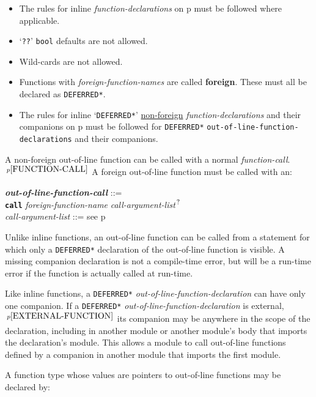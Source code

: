 \documentclass[12pt]{article}
\newcommand{\QMARK}{{$^{\,\mbox{\footnotesize ?}}$}}
\newcommand{\key}[1]{{\rm \bfseries #1}}
\newcommand{\ttkey}[1]{{\tt \bfseries #1}}
\newcommand{\emkey}[1]{{\em \bfseries #1}}
\newcommand{\pagref}[1]{p\pageref{#1}}
\newcommand{\pagnote}[1]{$\,^{p\pageref{#1}}$}
\newenvironment{indpar}[1][0.3in]%
	{\begin{list}{}%
		     {\setlength{\itemsep}{0in}%
		      \setlength{\topsep}{0in}%
		      \setlength{\parsep}{1ex}%
		      \setlength{\labelwidth}{#1}%
		      \setlength{\leftmargin}{#1}%
		      \addtolength{\leftmargin}{\labelsep}}%
	 \item}%
	{\end{list}}
\begin{document}
\begin{indpar}
\begin{itemize}
\item
The rules for inline {\em function-declarations} on
\pagref{FUNCTION-DECLARATION} must be followed where applicable.
\item
`{\tt ??}' {\tt bool} defaults are not allowed.
\item
Wild-cards are not allowed.
\item Functions with {\em foreign-function-names} are called \key{foreign}.
These must all be declared as {\tt *DEFERRED*}.
\item
The rules for inline `{\tt *DEFERRED*}' \underline{non-foreign}
{\em function-declarations} and
their companions on \pagref{COMPANION-DECLARATION}
must be followed for
{\tt *DEFERRED*} {\tt out-of-line-function-de\-clar\-ations}
and their companions.
\end{itemize}
\end{indpar}

A non-foreign out-of-line function can be called with a normal
{\em function-call}.\pagnote{FUNCTION-CALL}  A foreign
out-of-line function must be called with an:
\begin{indpar}
\emkey{out-of-line-function-call}%
	\label{OUT-OF-LINE-FUNCTION-CALL} ::= \\
\hspace*{0.25in}
	\ttkey{call} {\em foreign-function-name}
	     {\em call-argument-list}\QMARK{}
\\[0.5ex]
{\em call-argument-list} ::= see \pagref{CALL-ARGUMENT-LIST}
\end{indpar}

Unlike inline functions, an out-of-line function can
be called from a statement for which only a {\tt *DEFERRED*} declaration
of the out-of-line function is visible.  A missing companion
declaration is not a compile-time error, but will be a
run-time error if the function is actually called at run-time.

Like inline functions, a {\tt *DEFERRED*} {\em out-of-line-function-declaration}
can have only one companion.
If\label{OUT-OF-LINE-EXTERNAL-COMPANION}
a {\tt *DEFERRED*} {\em out-of-line-function-declaration}
is external,\pagnote{EXTERNAL-FUNCTION}
its companion may be anywhere in the scope of the declaration,
including in another module or another module's body that imports
the declaration's module.
This allows a module to call out-of-line functions defined by
a companion in another module that imports the first module.

A function type whose values are pointers to out-of-line
functions may be declared by:
\end{document}
